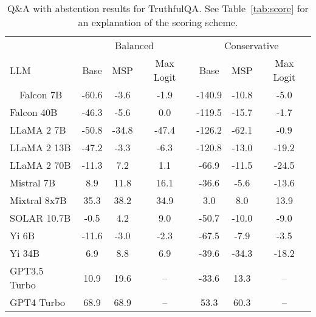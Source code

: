 \begin{table*}[h]
\centering
\caption{Q\&A with abstention results for TruthfulQA. See Table~\ref{tab:score} for an explanation of the scoring scheme.}
\label{tab:truthfulqa_score}
\begin{tabular}{lcccccc}
\toprule
& \multicolumn{3}{c}{Balanced} & \multicolumn{3}{c}{Conservative} \\ 
LLM & Base & MSP & Max Logit & Base & MSP & Max Logit \\ 
\cmidrule(lr){1-1}\cmidrule(lr){2-4}\cmidrule(lr){5-7}\ \ 
Falcon 7B & -60.6 & -3.6 & -1.9 & -140.9 & -10.8 & -5.0\\
Falcon 40B & -46.3 & -5.6 & 0.0 & -119.5 & -15.7 & -1.7\\
LLaMA 2 7B & -50.8 & -34.8 & -47.4 & -126.2 & -62.1 & -0.9\\
LLaMA 2 13B & -47.2 & -3.3 & -6.3 & -120.8 & -13.0 & -19.2\\
LLaMA 2 70B & -11.3 & 7.2 & 1.1 & -66.9 & -11.5 & -24.5\\
Mistral 7B & 8.9 & 11.8 & 16.1 & -36.6 & -5.6 & -13.6\\
Mixtral 8x7B & 35.3 & 38.2 & 34.9 & 3.0 & 8.0 & 13.9\\
SOLAR 10.7B & -0.5 & 4.2 & 9.0 & -50.7 & -10.0 & -9.0\\
Yi 6B & -11.6 & -3.0 & -2.3 & -67.5 & -7.9 & -3.5\\
Yi 34B & 6.9 & 8.8 & 6.9 & -39.6 & -34.3 & -18.2\\
GPT3.5 Turbo & 10.9 & 19.6 & -- & -33.6 & 13.3 & --\\
GPT4 Turbo & 68.9 & 68.9 & -- & 53.3 & 60.3 & --\\
\bottomrule
\end{tabular}
\end{table*}

